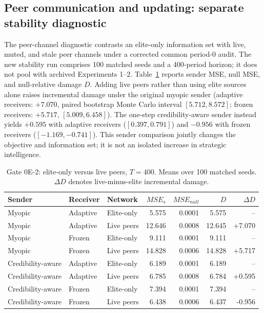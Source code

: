 \subsection{Peer communication and updating: separate stability diagnostic}
\label{sec:results_gate0e}

The peer-channel diagnostic contrasts an elite-only information set with live, muted, and stale peer channels under a corrected common period-0 audit. The new stability run comprises 100 matched seeds and a 400-period horizon; it does not pool with archived Experiments 1--2. Table~\ref{tab:gate0e_main} reports sender MSE, null MSE, and null-relative damage $D$. Adding live peers rather than using elite sources alone raises incremental damage under the original myopic sender (adaptive receivers: $+7.070$, paired bootstrap Monte Carlo interval $[5.712,8.572]$; frozen receivers: $+5.717$, $[5.009,6.458]$). The one-step credibility-aware sender instead yields $+0.595$ with adaptive receivers ($[0.397,0.791]$) and $-0.956$ with frozen receivers ($[-1.169,-0.741]$). This sender comparison jointly changes the objective and information set; it is not an isolated increase in strategic intelligence.

\begin{table}[H]
\centering
\small
\caption{Gate 0E-2: elite-only versus live peers, $T=400$. Means over 100 matched seeds. $\Delta D$ denotes live-minus-elite incremental damage.}
\label{tab:gate0e_main}
\begin{tabular}{lllrrrr}
\toprule
Sender & Receiver & Network & $MSE_{s}$ & $MSE_{null}$ & $D$ & $\Delta D$ \\
\midrule
Myopic & Adaptive & Elite-only & 5.575 & 0.0001 & 5.575 & -- \\
Myopic & Adaptive & Live peers & 12.646 & 0.0008 & 12.645 & +7.070 \\
Myopic & Frozen & Elite-only & 9.111 & 0.0001 & 9.111 & -- \\
Myopic & Frozen & Live peers & 14.828 & 0.0006 & 14.828 & +5.717 \\
Credibility-aware & Adaptive & Elite-only & 6.189 & 0.0001 & 6.189 & -- \\
Credibility-aware & Adaptive & Live peers & 6.785 & 0.0008 & 6.784 & +0.595 \\
Credibility-aware & Frozen & Elite-only & 7.394 & 0.0001 & 7.394 & -- \\
Credibility-aware & Frozen & Live peers & 6.438 & 0.0006 & 6.437 & -0.956 \\
\bottomrule
\end{tabular}
\end{table}

